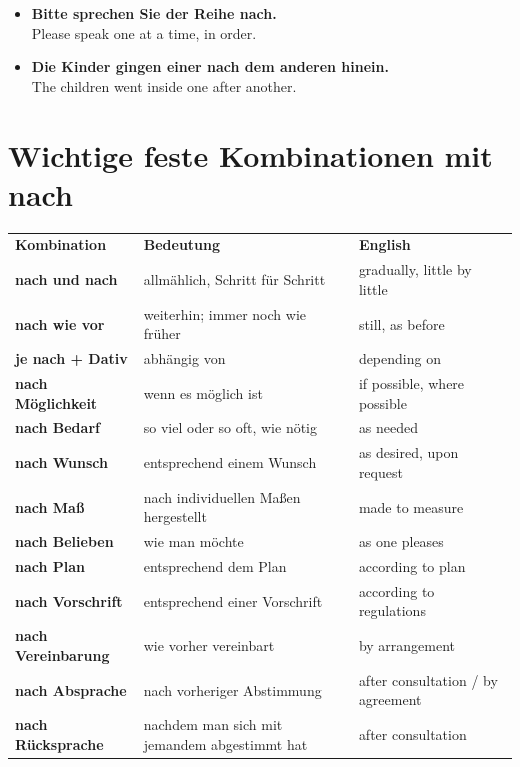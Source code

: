\documentclass[a4paper,11pt]{article}
\newcommand{\ExampleItem}[2]{\item \textbf{#1}\\{\small\color{SoftGray}#2}}
\begin{document}
        \begin{exbox}
            \begin{itemize}
                \ExampleItem{Bitte sprechen Sie der Reihe nach.}{Please speak one at a time, in order.}
                \ExampleItem{Die Kinder gingen einer nach dem anderen hinein.}{The children went inside one after another.}
            \end{itemize}
        \end{exbox}


    \section{Wichtige feste Kombinationen mit nach}

        \begin{longtable}{>{\bfseries}p{4.2cm}|p{5.0cm}|p{5.0cm}}
            \rowcolor{HeaderBlueDark}
            \color{white}\textbf{Kombination} &
            \color{white}\textbf{Bedeutung} &
            \color{white}\textbf{English} \\
            nach und nach & allmählich, Schritt für Schritt & gradually, little by little \\
            nach wie vor & weiterhin; immer noch wie früher & still, as before \\
            je nach + Dativ & abhängig von & depending on \\
            nach Möglichkeit & wenn es möglich ist & if possible, where possible \\
            nach Bedarf & so viel oder so oft, wie nötig & as needed \\
            nach Wunsch & entsprechend einem Wunsch & as desired, upon request \\
            nach Maß & nach individuellen Maßen hergestellt & made to measure \\
            nach Belieben & wie man möchte & as one pleases \\
            nach Plan & entsprechend dem Plan & according to plan \\
            nach Vorschrift & entsprechend einer Vorschrift & according to regulations \\
            nach Vereinbarung & wie vorher vereinbart & by arrangement \\
            nach Absprache & nach vorheriger Abstimmung & after consultation / by agreement \\
            nach Rücksprache & nachdem man sich mit jemandem abgestimmt hat & after consultation \\

\end{longtable}
\end{document}
